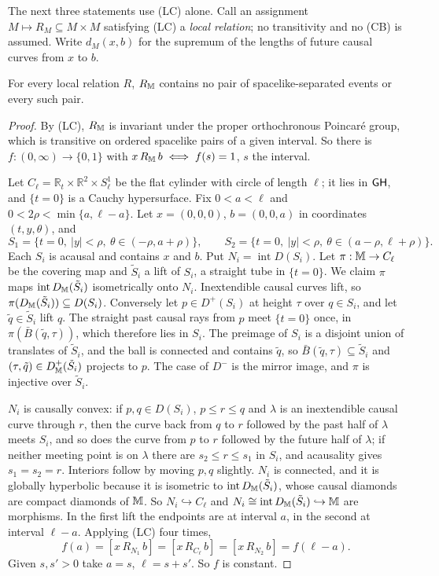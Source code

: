 The next three statements use (LC) alone. Call an assignment $M\mapsto R_M
\subseteq M\times M$ satisfying (LC) a \emph{local relation}; no transitivity
and no (CB) is assumed. Write $d_M(x,b)$ for the supremum of the lengths of
future causal curves from $x$ to $b$.

\begin{proposition}\label{prop:noscale}
For every local relation $R$, $R_\mathbb M$ contains no pair of spacelike-separated
events or every such pair.
\end{proposition}

\begin{proof}
By (LC), $R_\mathbb M$ is invariant under the proper orthochronous Poincaré group,
which is transitive on ordered spacelike pairs of a given interval. So there is
$f:(0,\infty)\to\{0,1\}$ with $x\,R_\mathbb M\,b\iff f(s)=1$, $s$ the interval.

Let $C_\ell=\mathbb R_t\times\mathbb R^2\times S^1_\ell$ be the flat cylinder
with circle of length $\ell$; it lies in $\mathsf{GH}$, and $\{t=0\}$ is a Cauchy
hypersurface. Fix $0<a<\ell$ and $0<2\rho<\min\{a,\ell-a\}$. Let $x=(0,0,0)$,
$b=(0,0,a)$ in coordinates $(t,y,\theta)$, and
\[
S_1=\{t=0,\ |y|<\rho,\ \theta\in(-\rho,a+\rho)\},\qquad
S_2=\{t=0,\ |y|<\rho,\ \theta\in(a-\rho,\ell+\rho)\}.
\]
Each $S_i$ is acausal and contains $x$ and $b$. Put $N_i=\operatorname{int}
D(S_i)$. Let $\pi:\mathbb M\to C_\ell$ be the covering map and $\tilde S_i$ a lift
of $S_i$, a straight tube in $\{t=0\}$. We claim $\pi$ maps
$\operatorname{int}D_\mathbb M(\tilde S_i)$ isometrically onto $N_i$. Inextendible
causal curves lift, so $\pi(D_\mathbb M(\tilde S_i))\subseteq D(S_i)$. Conversely
let $p\in D^+(S_i)$ at height $\tau$ over $q\in S_i$, and let $\tilde q\in
\tilde S_i$ lift $q$. The straight past causal rays from $p$ meet $\{t=0\}$
once, in $\pi(\bar B(\tilde q,\tau))$, which therefore lies in $S_i$. The
preimage of $S_i$ is a disjoint union of translates of $\tilde S_i$, and the
ball is connected and contains $\tilde q$, so $\bar B(\tilde q,\tau)\subseteq
\tilde S_i$ and $(\tau,\tilde q)\in D^+_\mathbb M(\tilde S_i)$ projects to $p$.
The case of $D^-$ is the mirror image, and $\pi$ is injective over $\tilde S_i$.

$N_i$ is causally convex: if $p,q\in D(S_i)$, $p\le r\le q$ and $\lambda$ is an
inextendible causal curve through $r$, then the curve back from $q$ to $r$
followed by the past half of $\lambda$ meets $S_i$, and so does the curve from
$p$ to $r$ followed by the future half of $\lambda$; if neither meeting point
is on $\lambda$ there are $s_2\le r\le s_1$ in $S_i$, and acausality gives
$s_1=s_2=r$. Interiors follow by moving $p,q$ slightly. $N_i$ is connected,
and it is globally hyperbolic because it is isometric to
$\operatorname{int}D_\mathbb M(\tilde S_i)$, whose causal diamonds are compact
diamonds of $\mathbb M$. So $N_i\hookrightarrow C_\ell$ and
$N_i\cong\operatorname{int}D_\mathbb M(\tilde S_i)\hookrightarrow\mathbb M$ are
morphisms. In the first lift the endpoints are at interval $a$, in the second
at interval $\ell-a$. Applying (LC) four times,
\[
f(a)=[x\,R_{N_1}\,b]=[x\,R_{C_\ell}\,b]=[x\,R_{N_2}\,b]=f(\ell-a).
\]
Given $s,s'>0$ take $a=s$, $\ell=s+s'$. So $f$ is constant.
\end{proof}

